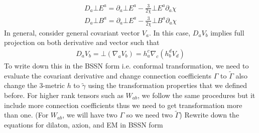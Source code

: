 \documentclass[prd]{revtex4}
\begin{document}
\begin{align}
D_a \bot E^a = \partial_a \bot E^a - \frac{3}{2 \chi} \bot E^a \partial_a \chi  \\
D_a \bot B^a = \partial_a \bot E^a - \frac{3}{2 \chi} \bot B^a \partial_a \chi 
\end{align}
In general, consider general covariant vector $V_a$. In this case, $D_a V_b$ implies full projection on both derivative and vector such that 
\begin{align}
D_a V_b = \bot (\nabla_a V_b) = h_a^c \nabla_c (h_b^d V_d)
\end{align}
To write down this in the BSSN form i.e. conformal transformation, we need to evaluate the covariant derivative and change connection coefficients $\Gamma$ to $\tilde{\Gamma}$ also change the 3-metric $h$ to $\tilde{\gamma}$ using the transformation properties that we defined before. For higher rank tensors such as $W_{ab}$, we follow the same procedures but it include more connection coefficients thus we need to get transformation more than one. (For $W_{ab}$, we will have two $\Gamma$ so we need two $\tilde{\Gamma}$)
Rewrite down the equations for dilaton, axion, and EM in BSSN form 
\end{document}
